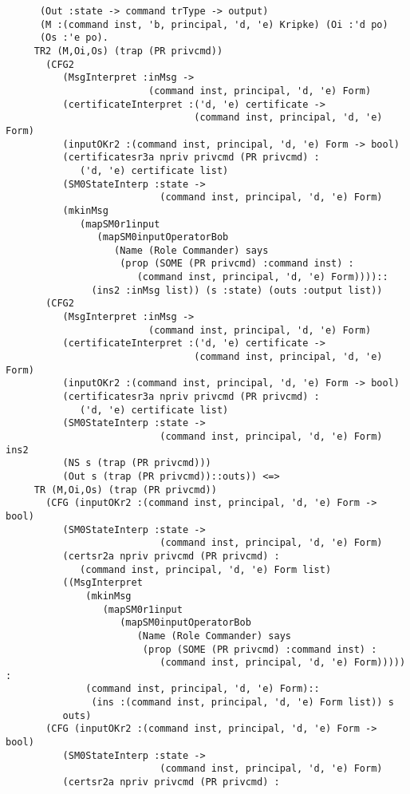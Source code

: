 \documentclass{report}
\begin{document}
\begin{session}
\begin{scriptsize}
\begin{verbatim}
      (Out :state -> command trType -> output)
      (M :(command inst, 'b, principal, 'd, 'e) Kripke) (Oi :'d po)
      (Os :'e po).
     TR2 (M,Oi,Os) (trap (PR privcmd))
       (CFG2
          (MsgInterpret :inMsg ->
                         (command inst, principal, 'd, 'e) Form)
          (certificateInterpret :('d, 'e) certificate ->
                                 (command inst, principal, 'd, 'e) Form)
          (inputOKr2 :(command inst, principal, 'd, 'e) Form -> bool)
          (certificatesr3a npriv privcmd (PR privcmd) :
             ('d, 'e) certificate list)
          (SM0StateInterp :state ->
                           (command inst, principal, 'd, 'e) Form)
          (mkinMsg
             (mapSM0r1input
                (mapSM0inputOperatorBob
                   (Name (Role Commander) says
                    (prop (SOME (PR privcmd) :command inst) :
                       (command inst, principal, 'd, 'e) Form))))::
               (ins2 :inMsg list)) (s :state) (outs :output list))
       (CFG2
          (MsgInterpret :inMsg ->
                         (command inst, principal, 'd, 'e) Form)
          (certificateInterpret :('d, 'e) certificate ->
                                 (command inst, principal, 'd, 'e) Form)
          (inputOKr2 :(command inst, principal, 'd, 'e) Form -> bool)
          (certificatesr3a npriv privcmd (PR privcmd) :
             ('d, 'e) certificate list)
          (SM0StateInterp :state ->
                           (command inst, principal, 'd, 'e) Form) ins2
          (NS s (trap (PR privcmd)))
          (Out s (trap (PR privcmd))::outs)) <=>
     TR (M,Oi,Os) (trap (PR privcmd))
       (CFG (inputOKr2 :(command inst, principal, 'd, 'e) Form -> bool)
          (SM0StateInterp :state ->
                           (command inst, principal, 'd, 'e) Form)
          (certsr2a npriv privcmd (PR privcmd) :
             (command inst, principal, 'd, 'e) Form list)
          ((MsgInterpret
              (mkinMsg
                 (mapSM0r1input
                    (mapSM0inputOperatorBob
                       (Name (Role Commander) says
                        (prop (SOME (PR privcmd) :command inst) :
                           (command inst, principal, 'd, 'e) Form))))) :
              (command inst, principal, 'd, 'e) Form)::
               (ins :(command inst, principal, 'd, 'e) Form list)) s
          outs)
       (CFG (inputOKr2 :(command inst, principal, 'd, 'e) Form -> bool)
          (SM0StateInterp :state ->
                           (command inst, principal, 'd, 'e) Form)
          (certsr2a npriv privcmd (PR privcmd) :

\end{verbatim}
\end{scriptsize}
\end{session}
\end{document}
